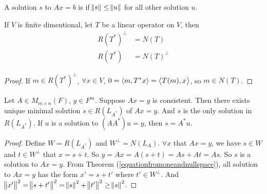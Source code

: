 \begin{definition}
    A solution $s$ to $Ax=b$ is  if $\norm{s} \leq \norm{u}$ for all other solution $u$.
\end{definition}

\begin{theorem}
    If $V$ is finite dimentional, let $T$ be a linear operator on $V$, then
    \begin{equation*}
        \begin{aligned}
            R(T^*)^\bot &= N(T)\\
            R(T^*) &= N(T)^\bot
        \end{aligned}
    \end{equation*}    
\end{theorem}
\begin{proof}
    If $m \in R(T^*)^\bot$, $\forall x \in V$, $0 = \left\langle \displaystyle m, T^*x \right\rangle = \left\langle \displaystyle T(m), x \right\rangle$, so $m \in N(T)$.
\end{proof}


\begin{theorem}
    Let $A \in M_{m\times n} (F)$, $y \in F^m$. Suppose $Ax=y$ is consistent. Then there exists unique minimal solution $s \in R(L_{A^*})$ of $Ax=y$. And $s$ is the only solution in $R(L_{A^*})$. If $u$ is a solution to $(AA^*) u = y$, then $s = A^* u$.
\end{theorem}
\begin{proof}
    Define $W = R(L_{A^*})$ and $W^\bot = N(L_A)$. $\forall x$ that $Ax = y$, we have $s \in W$ and $t \in W^\bot$ that $x=s+t$. So $y = Ax = A(s + t) = As + At = As$. So $s$ is a solution to $Ax=y$. From Theorem (\ref{equationfromoneandnullspace}), all solution to $Ax=y$ has the form $x' = s + t'$ where $t' \in W^\bot$. And $\norm{x'}^2 = \norm{s + t'}^2 = \norm{s}^2 + \norm{t'}^2 \geq \norm{s}^2$.
\end{proof}










